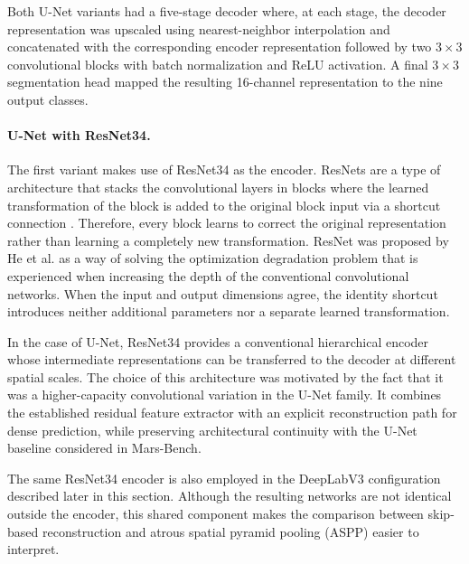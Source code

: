 Both U-Net variants had a five-stage decoder where, at each stage, the decoder representation was upscaled using nearest-neighbor interpolation and concatenated with the corresponding encoder representation followed by two \(3 \times 3\) convolutional blocks with batch normalization and ReLU activation. A final \(3 \times 3\) segmentation head mapped the resulting 16-channel representation to the nine output classes.

\paragraph{U-Net with ResNet34.}

The first variant makes use of ResNet34 as the encoder. ResNets are a type of architecture that stacks the convolutional layers in blocks where the learned transformation of the block is added to the original block input via a shortcut connection \cite{he2016resnet}. Therefore, every block learns to correct the original representation rather than learning a completely new transformation. ResNet was proposed by He et al. as a way of solving the optimization degradation problem that is experienced when increasing the depth of the conventional convolutional networks. When the input and output dimensions agree, the identity shortcut introduces neither additional parameters nor a separate learned transformation.

In the case of U-Net, ResNet34 provides a conventional hierarchical encoder whose intermediate representations can be transferred to the decoder at different spatial scales. The choice of this architecture was motivated by the fact that it was a higher-capacity convolutional variation in the U-Net family. It combines the established residual feature extractor with an explicit reconstruction path for dense prediction, while preserving architectural continuity with the U-Net baseline considered in Mars-Bench.

The same ResNet34 encoder is also employed in the DeepLabV3 configuration described later in this section. Although the resulting networks are not identical outside the encoder, this shared component makes the comparison between skip-based reconstruction and atrous spatial pyramid pooling (ASPP) easier to interpret.


